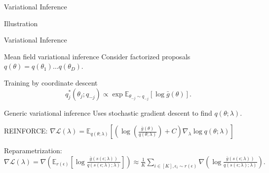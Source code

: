 \documentclass[pdf]{beamer}
\def \Ev {{\mathbb E}}
\def \gu {{\bar{g}}}
\begin{document}
\begin{frame}{Variational Inference}
\begin{block}{Illustration}
\begin{figure}
	\centering
\end{figure}
\end{block}
\end{frame}

\begin{frame}{Variational Inference}
\begin{block}{Mean field variational inference}
	Consider factorized proposals $q(\theta) = q(\theta_1)\ldots q(\theta_D)$.
	
	Training by coordinate descent 
	\begin{equation*}
	q^{*}_j(\theta_j;q_{-j}) \propto \exp \Ev_{\theta_{-j} \sim q_{-j}} [ \log \gu(\theta)].
	\end{equation*}
	
\end{block}
\begin{block}{Generic variational inference}
Uses stochastic gradient descent to find $q(\theta;\lambda)$.

REINFORCE: $\nabla \mathcal{L}(\lambda) = \Ev_{q(\theta;\lambda)} \left[ \left( \log \left( \frac{\gu(\theta)}{q(\theta;\lambda)}\right) + C\right) \nabla_{\lambda} \log q(\theta;\lambda) \right]$

Reparametrization: $\nabla \mathcal{L}(\lambda) = \nabla \left( \Ev_{r(\epsilon)} \left[\log \frac{ \gu(s(\epsilon;\lambda))}{q(s(\epsilon;\lambda);\lambda)}\right]\right) \approx \frac{1}{K} \sum_{i \in [K], \epsilon_i \sim r(\epsilon)} \nabla \left( \log \frac{ \gu(s(\epsilon;\lambda))}{q(s(\epsilon;\lambda);\lambda)} \right).$
\end{block}
\end{frame}
\end{document}
